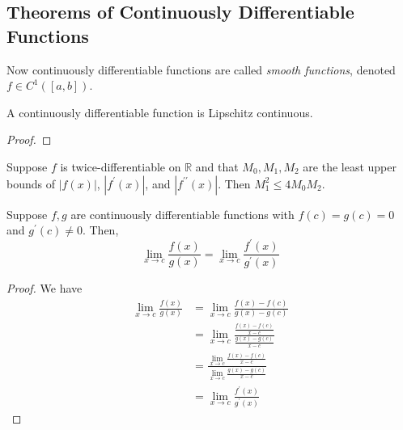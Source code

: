 \subsection{Theorems of Continuously Differentiable Functions}

  Now continuously differentiable functions are called \textit{smooth functions}, denoted $f \in C^1([a, b])$. 

  \begin{theorem}
    A continuously differentiable function is Lipschitz continuous. 
  \end{theorem}
  \begin{proof}
    
  \end{proof} 

  \begin{example}
    Suppose $f$ is twice-differentiable on $\mathbb{R}$ and that $M_0, M_1, M_2$ are the least upper bounds of $|f(x)|$, $|f^\prime (x)|$, and $|f^{\prime\prime} (x)|$. Then $M_1^2 \leq 4 M_0 M_2$. 


  \end{example}

  \begin{theorem}
    Suppose $f, g$ are continuously differentiable functions with $f(c) = g(c) = 0$ and $g^\prime (c) \neq 0$. Then, 
    \begin{equation}
      \lim_{x \to c} \frac{f(x)}{g(x)} = \lim_{x \to c} \frac{f^\prime (x)}{g^\prime (x)}
    \end{equation}
  \end{theorem}
  \begin{proof}
    We have 
    \begin{align}
      \lim_{x \to c} \frac{f(x)}{g(x)} & = \lim_{x \to c} \frac{f(x) - f(c)}{g(x) - g(c)} \\ 
                                       & = \lim_{x \to c} \frac{\frac{f(x) - f(c)}{x -  c}}{\frac{g(x) - g(c)}{x - c}} \\ 
                                       & = \frac{\lim_{x \to c} \frac{f(x) - f(c)}{x - c}}{\lim_{x \to c} \frac{g(x) - g(c)}{x - c}} \\ 
                                       & = \lim_{x \to c} \frac{f^\prime (x)}{g^\prime (x)}
    \end{align}
  \end{proof}

